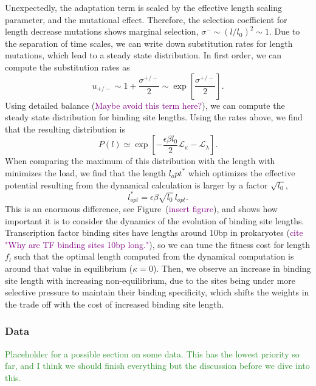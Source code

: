 \documentclass[10pt,a4paper]{article}
\newcommand{\purple}[1]{\textcolor{purple}{#1}}
\begin{document}
Unexpectedly, the adaptation term is scaled by the effective length scaling parameter, and the mutational effect. Therefore, the selection coefficient for length decrease mutations shows marginal selection, $\sigma^-\sim (l/l_0)^2\sim 1$. Due to the separation of time scales, we can write down substitution rates for length mutations, which lead to a steady state distribution. In first order, we can compute the substitution rates as 
\begin{equation}
	u_{+/-} \sim 1 + \frac{\sigma^{+/-}}{2} \sim \exp\left[\frac{\sigma^{+/-}}{2} \right].
\end{equation}
Using detailed balance (\purple{Maybe avoid this term here?}), we can compute the steady state distribution for binding site lengths. Using the rates above, we find that the resulting distribution is
\begin{equation}
	P(l) \simeq \exp\left[-\frac{\epsilon\beta l_0}{2}\mathcal{L}_\kappa - \mathcal{L}_\lambda\right].
	\label{equ:length_distribution}
\end{equation}
When comparing the maximum of this distribution with the length with minimizes the load, we find that the length $l_opt^*$ which optimizes the effective potential resulting from the dynamical calculation is larger by a factor $\sqrt{l_0}$,
\begin{equation}
	l_{opt}^* = \epsilon\beta\sqrt{l_0}\,l_{opt}.
\end{equation}
This is an enormous difference, see Figure~(\purple{insert figure}), and shows how important it is to consider the dynamics of the evolution of binding site lengths. Transcription factor binding sites have lengths around 10bp in prokaryotes (\purple{cite "Why are TF binding sites 10bp long."}), so we can tune the fitness cost for length $f_l$ such that the optimal length computed from the dynamical computation is around that value in equilibrium ($\kappa=0$). Then, we observe an increase in binding site length with increasing non-equilibrium, due to the sites being under more selective pressure to maintain their binding specificity, which shifts the weights in the trade off with the cost of increased binding site length.

\subsubsection*{Data}
\textcolor{ForestGreen}{Placeholder for a possible section on some data. This has the lowest priority so far, and I think we should finish everything but the discussion before we dive into this.}
\end{document}
